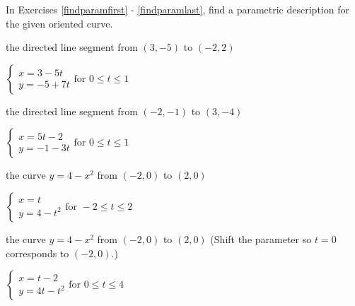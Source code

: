 \documentclass{ximera}
\begin{document}
\begin{question}
In Exercises \ref{findparamfirst} - \ref{findparamlast}, find a parametric description for the given oriented curve.

\begin{problem} \label{findparamfirst}
the directed line segment from $(3,-5)$ to $(-2,2)$ 

\begin{solution}
 ${ \left\{ \begin{array}{l} x = 3-5t \\ y =-5+7t \end{array} \right. \text{for } 0 \leq t \leq 1}$
\end{solution}

\end{problem}

\begin{problem}
the directed line segment from $(-2,-1)$ to $(3, -4)$

\begin{solution}
 ${ \left\{ \begin{array}{l} x = 5t-2 \\ y =-1-3t \end{array} \right. \text{for } 0 \leq t \leq 1}$
\end{solution}
\end{problem}

\begin{problem}
the curve $y = 4-x^2$ from $(-2,0)$ to $(2,0)$

\begin{solution}
 ${ \left\{ \begin{array}{l} x = t \\ y = 4-t^2  \end{array} \right. \text{for } -2 \leq t \leq 2}$
\end{solution}
\end{problem}

\begin{problem}
 the curve $y = 4-x^2$ from $(-2,0)$ to $(2,0)$
(Shift the parameter so  $t=0$ corresponds to $(-2,0)$.)

\begin{solution}
 ${ \left\{ \begin{array}{l} x = t-2 \\ y = 4t-t^2  \end{array} \right. \text{for } 0 \leq t \leq 4}$
\end{solution}
\end{problem}


\end{question}
\end{document}
